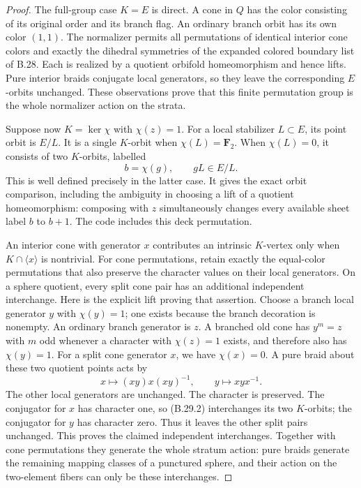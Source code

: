 \begin{proof}
The full-group case $K=E$ is direct.  A cone in $Q$ has the color
consisting of its original order and its branch flag.
An ordinary branch orbit has its own color $(1,1)$.
The normalizer permits all permutations of identical interior
cone colors and exactly the dihedral symmetries of the expanded
colored boundary list of B.28.  Each is realized by a quotient
orbifold homeomorphism and hence lifts.  Pure interior braids
conjugate local generators, so they leave the corresponding
$E$-orbits unchanged.  These observations prove that this finite
permutation group is the whole normalizer action on the strata.

Suppose now $K=\ker\chi$ with $\chi(z)=1$.
For a local stabilizer $L\subset E$, its point orbit is $E/L$.
It is a single $K$-orbit when $\chi(L)=\mathbf F_2$.
When $\chi(L)=0$, it consists of two $K$-orbits, labelled
\[
                       b=\chi(g),\qquad gL\in E/L.    \tag{B.29.2}
\]
This is well defined precisely in the latter case.
It gives the exact orbit comparison, including the ambiguity in
choosing a lift of a quotient homeomorphism: composing with $z$
simultaneously changes every available sheet label $b$ to $b+1$.
The code includes this deck permutation.

An interior cone with generator $x$ contributes an intrinsic
$K$-vertex only when $K\cap\langle x\rangle$ is nontrivial.
For cone permutations, retain exactly the equal-color permutations
that also preserve the character values on their local generators.
On a sphere quotient, every split cone pair has an additional
independent interchange.  Here is the explicit lift proving that
assertion.  Choose a branch local generator $y$ with $\chi(y)=1$;
one exists because the branch decoration is nonempty.
An ordinary branch generator is $z$.  A branched old cone has
$y^m=z$ with $m$ odd whenever a character with $\chi(z)=1$ exists,
and therefore also has $\chi(y)=1$.
For a split cone generator $x$, we have $\chi(x)=0$.
A pure braid about these two quotient points acts by
\[
       x\longmapsto(xy)x(xy)^{-1},
       \qquad y\longmapsto xyx^{-1}.                 \tag{B.29.3}
\]
The other local generators are unchanged.
The character is preserved.  The conjugator for $x$ has character
one, so (B.29.2) interchanges its two $K$-orbits; the conjugator for
$y$ has character zero.  Thus it leaves the other split pairs
unchanged.  This proves the claimed independent interchanges.
Together with cone permutations they generate the whole stratum
action: pure braids generate the remaining mapping classes of a
punctured sphere, and their action on the two-element fibers can
only be these interchanges.


\end{proof}

